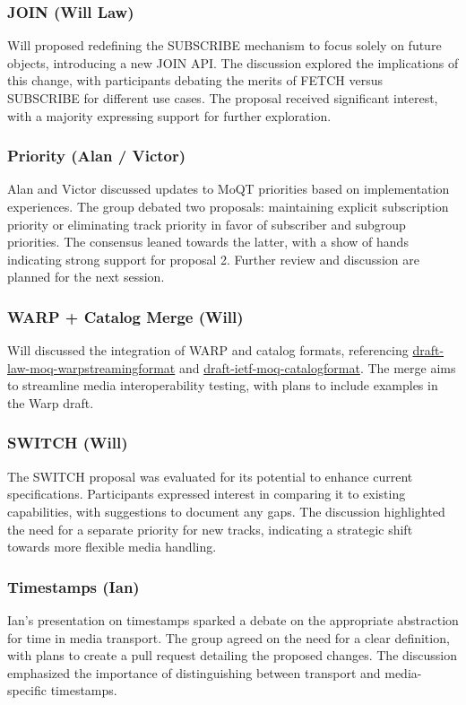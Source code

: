 \documentclass{article}
\begin{document}
\subsubsection{JOIN (Will Law)}
Will proposed redefining the SUBSCRIBE mechanism to focus solely on future objects, introducing a new JOIN API. The discussion explored the implications of this change, with participants debating the merits of FETCH versus SUBSCRIBE for different use cases. The proposal received significant interest, with a majority expressing support for further exploration.

\subsubsection{Priority (Alan / Victor)}
Alan and Victor discussed updates to MoQT priorities based on implementation experiences. The group debated two proposals: maintaining explicit subscription priority or eliminating track priority in favor of subscriber and subgroup priorities. The consensus leaned towards the latter, with a show of hands indicating strong support for proposal 2. Further review and discussion are planned for the next session.

\subsubsection{WARP + Catalog Merge (Will)}
Will discussed the integration of WARP and catalog formats, referencing \href{https://datatracker.ietf.org/doc/html/draft-law-moq-warpstreamingformat}{draft-law-moq-warpstreamingformat} and \href{https://datatracker.ietf.org/doc/html/draft-ietf-moq-catalogformat}{draft-ietf-moq-catalogformat}. The merge aims to streamline media interoperability testing, with plans to include examples in the Warp draft.

\subsubsection{SWITCH (Will)}
The SWITCH proposal was evaluated for its potential to enhance current specifications. Participants expressed interest in comparing it to existing capabilities, with suggestions to document any gaps. The discussion highlighted the need for a separate priority for new tracks, indicating a strategic shift towards more flexible media handling.

\subsubsection{Timestamps (Ian)}
Ian's presentation on timestamps sparked a debate on the appropriate abstraction for time in media transport. The group agreed on the need for a clear definition, with plans to create a pull request detailing the proposed changes. The discussion emphasized the importance of distinguishing between transport and media-specific timestamps.
\end{document}
